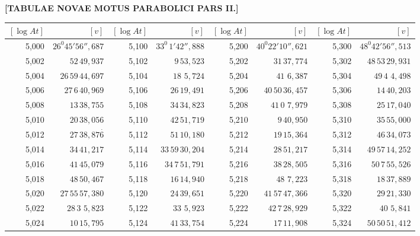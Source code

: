 \clearpage
{}
\begingroup
\centering
\fontsize{9}{9}\selectfont
\setlength{\tabcolsep}{1.25pt}
\renewcommand{\arraystretch}{.9}
\setlength{\parskip}{0pt}
\textbf{[TABULAE NOVAE MOTUS PARABOLICI PARS II.]}
\par\vspace{7pt}
\begin{tabular}{|r|r||r|r||r|r||r|r|}
\hline
\([\log At]\) & \([v]\) & \([\log At]\) & \([v]\) & \([\log At]\) & \([v]\) & \([\log At]\) & \([v]\) \\
\hline
5,000 & \(26^{0}45'56'',\!687\) & 5,100 & \(33^{0}\,1'42'',\!888\) & 5,200 & \(40^{0}22'10'',\!621\) & 5,300 & \(48^{0}42'56'',\!513\) \\[1pt]
5,002 & \(52\,49,\!937\) & 5,102 & \(9\,53,\!523\) & 5,202 & \(31\,37,\!774\) & 5,302 & \(48\,53\,29,\!931\) \\
5,004 & \(26\,59\,44,\!697\) & 5,104 & \(18\,\,5,\!724\) & 5,204 & \(41\,\,6,\!387\) & 5,304 & \(49\,4\,\,4,\!498\) \\
5,006 & \(27\,6\,40,\!969\) & 5,106 & \(26\,19,\!491\) & 5,206 & \(40\,50\,36,\!457\) & 5,306 & \(14\,40,\!203\) \\
5,008 & \(13\,38,\!755\) & 5,108 & \(34\,34,\!823\) & 5,208 & \(41\,0\,\,7,\!979\) & 5,308 & \(25\,17,\!040\) \\[1pt]
5,010 & \(20\,38,\!056\) & 5,110 & \(42\,51,\!719\) & 5,210 & \(9\,40,\!950\) & 5,310 & \(35\,55,\!000\) \\[1pt]
5,012 & \(27\,38,\!87\overset{\cdot}{6}\) & 5,112 & \(51\,10,\!180\) & 5,212 & \(19\,15,\!364\) & 5,312 & \(46\,34,\!073\) \\
5,014 & \(34\,41,\!217\) & 5,114 & \(33\,59\,30,\!204\) & 5,214 & \(28\,51,\!217\) & 5,314 & \(49\,57\,14,\!252\) \\
5,016 & \(41\,45,\!079\) & 5,116 & \(34\,7\,51,\!791\) & 5,216 & \(38\,28,\!505\) & 5,316 & \(50\,7\,55,\!526\) \\
5,018 & \(48\,50,\!467\) & 5,118 & \(16\,14,\!940\) & 5,218 & \(48\,\,7,\!223\) & 5,318 & \(18\,37,\!889\) \\[1pt]
5,020 & \(27\,55\,57,\!380\) & 5,120 & \(24\,39,\!651\) & 5,220 & \(41\,57\,47,\!366\) & 5,320 & \(29\,21,\!330\) \\[1pt]
5,022 & \(28\,3\,\,5,\!823\) & 5,122 & \(33\,\,5,\!923\) & 5,222 & \(42\,7\,28,\!929\) & 5,322 & \(40\,\,5,\!841\) \\
5,024 & \(10\,15,\!795\) & 5,124 & \(41\,33,\!754\) & 5,224 & \(17\,11,\!908\) & 5,324 & \(50\,50\,51,\!412\) \\

\end{tabular}

